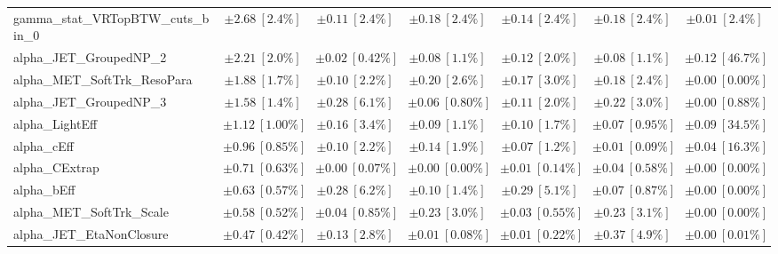 \begin{sidewaystable}
\begin{center}
\begin{tabular*}{\textwidth}{@{\extracolsep{\fill}}lcccccc}
gamma\_stat\_VRTopBTW\_cuts\_bin\_0         & $\pm 2.68\ [2.4\%] $          & $\pm 0.11\ [2.4\%] $          & $\pm 0.18\ [2.4\%] $          & $\pm 0.14\ [2.4\%] $          & $\pm 0.18\ [2.4\%] $          & $\pm 0.01\ [2.4\%] $       \\
alpha\_JET\_GroupedNP\_2         & $\pm 2.21\ [2.0\%] $          & $\pm 0.02\ [0.42\%] $          & $\pm 0.08\ [1.1\%] $          & $\pm 0.12\ [2.0\%] $          & $\pm 0.08\ [1.1\%] $          & $\pm 0.12\ [46.7\%] $       \\
alpha\_MET\_SoftTrk\_ResoPara         & $\pm 1.88\ [1.7\%] $          & $\pm 0.10\ [2.2\%] $          & $\pm 0.20\ [2.6\%] $          & $\pm 0.17\ [3.0\%] $          & $\pm 0.18\ [2.4\%] $          & $\pm 0.00\ [0.00\%] $       \\
alpha\_JET\_GroupedNP\_3         & $\pm 1.58\ [1.4\%] $          & $\pm 0.28\ [6.1\%] $          & $\pm 0.06\ [0.80\%] $          & $\pm 0.11\ [2.0\%] $          & $\pm 0.22\ [3.0\%] $          & $\pm 0.00\ [0.88\%] $       \\
alpha\_LightEff         & $\pm 1.12\ [1.00\%] $          & $\pm 0.16\ [3.4\%] $          & $\pm 0.09\ [1.1\%] $          & $\pm 0.10\ [1.7\%] $          & $\pm 0.07\ [0.95\%] $          & $\pm 0.09\ [34.5\%] $       \\
alpha\_cEff         & $\pm 0.96\ [0.85\%] $          & $\pm 0.10\ [2.2\%] $          & $\pm 0.14\ [1.9\%] $          & $\pm 0.07\ [1.2\%] $          & $\pm 0.01\ [0.09\%] $          & $\pm 0.04\ [16.3\%] $       \\
alpha\_CExtrap         & $\pm 0.71\ [0.63\%] $          & $\pm 0.00\ [0.07\%] $          & $\pm 0.00\ [0.00\%] $          & $\pm 0.01\ [0.14\%] $          & $\pm 0.04\ [0.58\%] $          & $\pm 0.00\ [0.00\%] $       \\
alpha\_bEff         & $\pm 0.63\ [0.57\%] $          & $\pm 0.28\ [6.2\%] $          & $\pm 0.10\ [1.4\%] $          & $\pm 0.29\ [5.1\%] $          & $\pm 0.07\ [0.87\%] $          & $\pm 0.00\ [0.00\%] $       \\
alpha\_MET\_SoftTrk\_Scale         & $\pm 0.58\ [0.52\%] $          & $\pm 0.04\ [0.85\%] $          & $\pm 0.23\ [3.0\%] $          & $\pm 0.03\ [0.55\%] $          & $\pm 0.23\ [3.1\%] $          & $\pm 0.00\ [0.00\%] $       \\
alpha\_JET\_EtaNonClosure         & $\pm 0.47\ [0.42\%] $          & $\pm 0.13\ [2.8\%] $          & $\pm 0.01\ [0.08\%] $          & $\pm 0.01\ [0.22\%] $          & $\pm 0.37\ [4.9\%] $          & $\pm 0.00\ [0.01\%] $       \\

\end{tabular*}
\end{center}
\end{sidewaystable}
